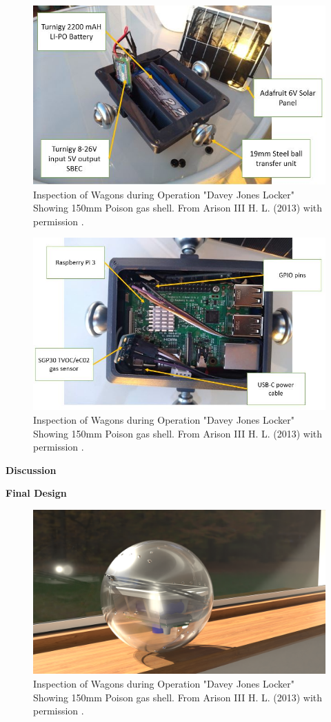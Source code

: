 \begin{figure}[H]
\centering
\includegraphics[width=0.5\linewidth]{Engineering_hardware/Engineering_hardware_Figures/prototype_pic_1.JPG}
\caption{Inspection of Wagons during Operation "Davey Jones Locker" Showing 150mm Poison gas shell. From Arison III H. L. (2013) with permission \cite{arison2014european}.  }
\label{fig:15cm_shell_loading}
\end{figure}



\begin{figure}[H]
\centering
\includegraphics[width=0.5\linewidth]{Engineering_hardware/Engineering_hardware_Figures/prototype_pic_2.JPG}
\caption{Inspection of Wagons during Operation "Davey Jones Locker" Showing 150mm Poison gas shell. From Arison III H. L. (2013) with permission \cite{arison2014european}.  }
\label{fig:15cm_shell_loading}
\end{figure}



\textbf{Discussion}



\textbf{Final Design}




\begin{figure}[H]
\centering
\includegraphics[width=0.8\linewidth]{Engineering_hardware/Engineering_hardware_Figures/0300.png}
\caption{Inspection of Wagons during Operation "Davey Jones Locker" Showing 150mm Poison gas shell. From Arison III H. L. (2013) with permission \cite{arison2014european}.  }
\label{fig:15cm_shell_loading}
\end{figure}



